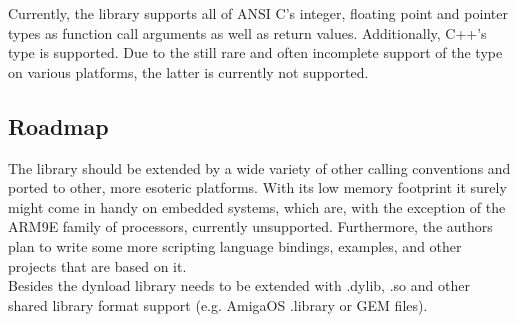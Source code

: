 Currently, the  library supports all of ANSI C's integer,
floating point and pointer types as function call arguments as well as return
values. Additionally, C++'s  type is supported. Due to the still
rare and often incomplete support of the  type on various
platforms, the latter is currently not supported.


\subsection{Roadmap}

The  library should be extended by a wide variety of other
calling conventions and ported to other, more esoteric platforms. With its low
memory footprint it surely might come in handy on embedded systems, which are,
with the exception of the ARM9E family of processors, currently unsupported.
Furthermore, the authors plan to write some more scripting language bindings,
examples, and other projects that are based on it.\\
Besides  the dynload library needs to be extended with
.dylib, .so and other shared library format support (e.g. AmigaOS .library or
GEM \cite{.ldg} files).

